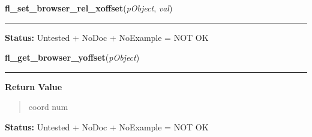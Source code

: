     \label{xformslib:library:fl_set_browser_rel_xoffset}

    \vspace{0.5ex}

\hspace{.8\funcindent}\begin{boxedminipage}{\funcwidth}

    \raggedright \textbf{fl\_set\_browser\_rel\_xoffset}(\textit{pObject}, \textit{val})

    \vspace{-1.5ex}

    \rule{\textwidth}{0.5\fboxrule}
\setlength{\parskip}{2ex}
\setlength{\parskip}{1ex}
\textbf{Status:} Untested + NoDoc + NoExample = NOT OK



    \end{boxedminipage}

    \label{xformslib:library:fl_get_browser_yoffset}

    \vspace{0.5ex}

\hspace{.8\funcindent}\begin{boxedminipage}{\funcwidth}

    \raggedright \textbf{fl\_get\_browser\_yoffset}(\textit{pObject})

    \vspace{-1.5ex}

    \rule{\textwidth}{0.5\fboxrule}
\setlength{\parskip}{2ex}
\setlength{\parskip}{1ex}
      \textbf{Return Value}
    \vspace{-1ex}

      \begin{quote}
      coord num

      \end{quote}

\textbf{Status:} Untested + NoDoc + NoExample = NOT OK



    \end{boxedminipage}

    \label{xformslib:library:fl_get_browser_rel_yoffset}


